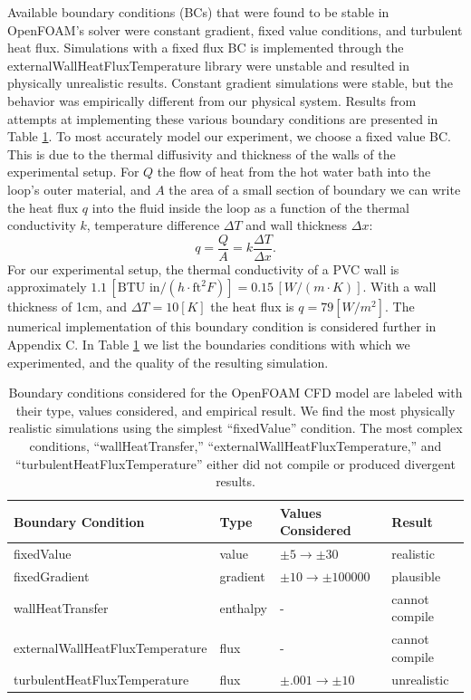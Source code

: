 \documentclass[12pt]{report}
\begin{document}
Available boundary conditions (BCs) that were found to be stable in OpenFOAM's solver were constant gradient, fixed value conditions, and turbulent heat flux.
Simulations with a fixed flux BC is implemented through the externalWallHeatFluxTemperature library were unstable and resulted in physically unrealistic results.
Constant gradient simulations were stable, but the behavior was empirically different from our physical system.
Results from attempts at implementing these various boundary conditions are presented in Table \ref{tb:ofbc}.
To most accurately model our experiment, we choose a fixed value BC.
This is due to the thermal diffusivity and thickness of the walls of the experimental setup.
For $Q$ the flow of heat from the hot water bath into the loop's outer material, and $A$ the area of a small section of boundary we can write the heat flux $q$ into the fluid inside the loop as a function of the thermal conductivity $k$, temperature difference $\Delta T$ and wall thickness $\Delta x$:
\begin{equation} q = \frac{Q}{A} = k \frac{\Delta T}{\Delta x} . \end{equation}
For our experimental setup, the thermal conductivity of a PVC wall is approximately $1.1 \, \left [ \text{BTU in}/(h\cdot \text{ft}^2 F) \right ]  = 0.15 \, \left [W/(m\cdot K)\right ] $.
With a wall thickness of 1cm, and $\Delta T = 10 \left [K \right ]$ the heat flux is $q=79 \left [ W/m^2 \right ]$.
The numerical implementation of this boundary condition is considered further in Appendix C.
In Table \ref{tb:ofbc} we list the boundaries conditions with which we experimented, and the quality of the resulting simulation.

\begin{table}
\begin{tabular}{llll}
\hline
Boundary Condition & Type & Values Considered & Result\\
\hline
\hline
fixedValue & value & $\pm 5 \to \pm 30$ & realistic\\
\hline
fixedGradient & gradient & $\pm 10 \to \pm 100000$ & plausible\\
\hline
wallHeatTransfer & enthalpy & - & cannot compile\\
\hline
externalWallHeatFluxTemperature & flux & - & cannot compile\\
\hline
turbulentHeatFluxTemperature & flux & $\pm .001 \to \pm10$ & unrealistic\\
\hline
\end{tabular}
\label{tb:ofbc}
\caption[Boundary conditions considered for the OpenFOAM CFD model are labeled with their type, values considered, and empirical result]{
  Boundary conditions considered for the OpenFOAM CFD model are labeled with their type, values considered, and empirical result.
  We find the most physically realistic simulations using the simplest ``fixedValue'' condition.
  The most complex conditions, ``wallHeatTransfer,'' ``externalWallHeatFluxTemperature,'' and ``turbulentHeatFluxTemperature'' either did not compile or produced divergent results.
  }
\end{table}
\end{document}
